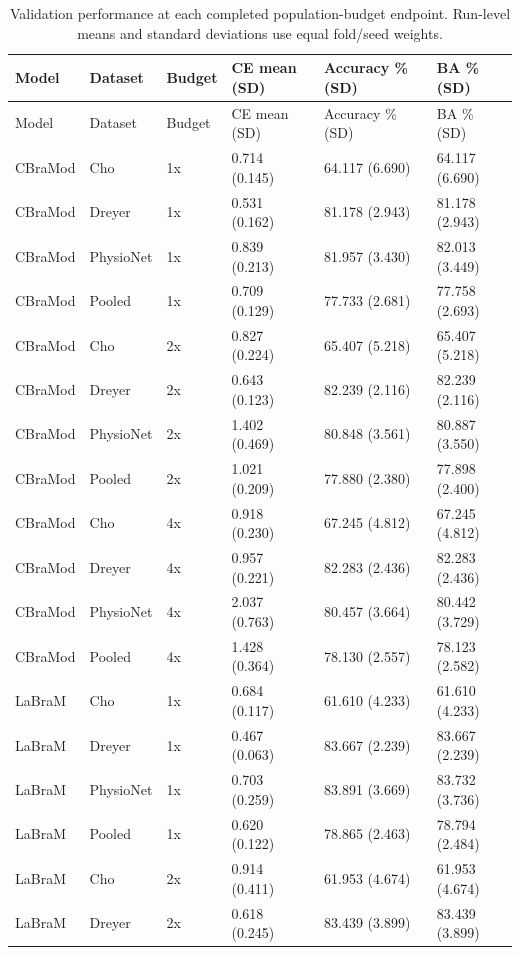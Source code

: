 \begin{longtable}{llllll}
\caption{Validation performance at each completed population-budget endpoint. Run-level means and standard deviations use equal fold/seed weights.}\label{tab:budget_validation}\\
\toprule
Model & Dataset & Budget & CE mean (SD) & Accuracy \% (SD) & BA \% (SD) \\
\midrule
\endfirsthead
\toprule
Model & Dataset & Budget & CE mean (SD) & Accuracy \% (SD) & BA \% (SD) \\
\midrule
\endhead
CBraMod & Cho & 1x & 0.714 (0.145) & 64.117 (6.690) & 64.117 (6.690) \\
CBraMod & Dreyer & 1x & 0.531 (0.162) & 81.178 (2.943) & 81.178 (2.943) \\
CBraMod & PhysioNet & 1x & 0.839 (0.213) & 81.957 (3.430) & 82.013 (3.449) \\
CBraMod & Pooled & 1x & 0.709 (0.129) & 77.733 (2.681) & 77.758 (2.693) \\
CBraMod & Cho & 2x & 0.827 (0.224) & 65.407 (5.218) & 65.407 (5.218) \\
CBraMod & Dreyer & 2x & 0.643 (0.123) & 82.239 (2.116) & 82.239 (2.116) \\
CBraMod & PhysioNet & 2x & 1.402 (0.469) & 80.848 (3.561) & 80.887 (3.550) \\
CBraMod & Pooled & 2x & 1.021 (0.209) & 77.880 (2.380) & 77.898 (2.400) \\
CBraMod & Cho & 4x & 0.918 (0.230) & 67.245 (4.812) & 67.245 (4.812) \\
CBraMod & Dreyer & 4x & 0.957 (0.221) & 82.283 (2.436) & 82.283 (2.436) \\
CBraMod & PhysioNet & 4x & 2.037 (0.763) & 80.457 (3.664) & 80.442 (3.729) \\
CBraMod & Pooled & 4x & 1.428 (0.364) & 78.130 (2.557) & 78.123 (2.582) \\
LaBraM & Cho & 1x & 0.684 (0.117) & 61.610 (4.233) & 61.610 (4.233) \\
LaBraM & Dreyer & 1x & 0.467 (0.063) & 83.667 (2.239) & 83.667 (2.239) \\
LaBraM & PhysioNet & 1x & 0.703 (0.259) & 83.891 (3.669) & 83.732 (3.736) \\
LaBraM & Pooled & 1x & 0.620 (0.122) & 78.865 (2.463) & 78.794 (2.484) \\
LaBraM & Cho & 2x & 0.914 (0.411) & 61.953 (4.674) & 61.953 (4.674) \\
LaBraM & Dreyer & 2x & 0.618 (0.245) & 83.439 (3.899) & 83.439 (3.899) \\

\end{longtable}
